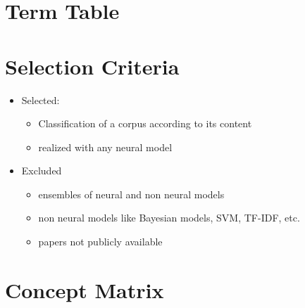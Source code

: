 	\section{Term Table}
	
	
	\section{Selection Criteria}
	\label{sec:selection_criteria}
	\begin{itemize}
		\item Selected:
		\begin{itemize}
			\item Classification of a corpus according to its content
			\item realized with any neural model
		\end{itemize}
		\item Excluded
		\begin{itemize}
			\item ensembles of neural and non neural models
			\item non neural models like Bayesian models, SVM, TF-IDF, etc.
			\item papers not publicly available
		\end{itemize}
	\end{itemize}
	
	\section{Concept Matrix}
	
	
